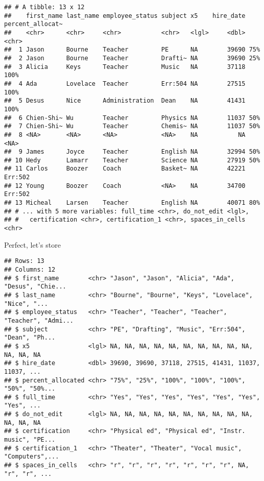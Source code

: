 \documentclass[
]{article}
\begin{document}
\begin{verbatim}
## # A tibble: 13 x 12
##    first_name last_name employee_status subject x5    hire_date percent_allocat~
##    <chr>      <chr>     <chr>           <chr>   <lgl>     <dbl> <chr>           
##  1 Jason      Bourne    Teacher         PE      NA        39690 75%             
##  2 Jason      Bourne    Teacher         Drafti~ NA        39690 25%             
##  3 Alicia     Keys      Teacher         Music   NA        37118 100%            
##  4 Ada        Lovelace  Teacher         Err:504 NA        27515 100%            
##  5 Desus      Nice      Administration  Dean    NA        41431 100%            
##  6 Chien-Shi~ Wu        Teacher         Physics NA        11037 50%             
##  7 Chien-Shi~ Wu        Teacher         Chemis~ NA        11037 50%             
##  8 <NA>       <NA>      <NA>            <NA>    NA           NA <NA>            
##  9 James      Joyce     Teacher         English NA        32994 50%             
## 10 Hedy       Lamarr    Teacher         Science NA        27919 50%             
## 11 Carlos     Boozer    Coach           Basket~ NA        42221 Err:502         
## 12 Young      Boozer    Coach           <NA>    NA        34700 Err:502         
## 13 Micheal    Larsen    Teacher         English NA        40071 80%             
## # ... with 5 more variables: full_time <chr>, do_not_edit <lgl>,
## #   certification <chr>, certification_1 <chr>, spaces_in_cells <chr>
\end{verbatim}

Perfect, let's store

\begin{verbatim}
## Rows: 13
## Columns: 12
## $ first_name        <chr> "Jason", "Jason", "Alicia", "Ada", "Desus", "Chie...
## $ last_name         <chr> "Bourne", "Bourne", "Keys", "Lovelace", "Nice", "...
## $ employee_status   <chr> "Teacher", "Teacher", "Teacher", "Teacher", "Admi...
## $ subject           <chr> "PE", "Drafting", "Music", "Err:504", "Dean", "Ph...
## $ x5                <lgl> NA, NA, NA, NA, NA, NA, NA, NA, NA, NA, NA, NA, NA
## $ hire_date         <dbl> 39690, 39690, 37118, 27515, 41431, 11037, 11037, ...
## $ percent_allocated <chr> "75%", "25%", "100%", "100%", "100%", "50%", "50%...
## $ full_time         <chr> "Yes", "Yes", "Yes", "Yes", "Yes", "Yes", "Yes", ...
## $ do_not_edit       <lgl> NA, NA, NA, NA, NA, NA, NA, NA, NA, NA, NA, NA, NA
## $ certification     <chr> "Physical ed", "Physical ed", "Instr. music", "PE...
## $ certification_1   <chr> "Theater", "Theater", "Vocal music", "Computers",...
## $ spaces_in_cells   <chr> "r", "r", "r", "r", "r", "r", "r", NA, "r", "r", ...
\end{verbatim}
\end{document}
